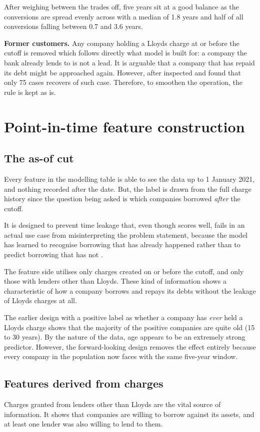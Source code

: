 \documentclass[ %
                    author={Natchalin Iwsakul \\[0.4em] Inkaphol Siriwongwattana \\[0.4em] Tanaphan Kummaraphat \\[0.6em] Patorn Srisupap},,
                supervisor={Fernando Moreno-Pino},
                    degree={MSc},
                     title={Propensity Modelling for SME Commercial Lending Using Open Public Data
},
                  subtitle={Companies House and GDELT as predictors of first-time borrowing},
                      type={},
                      year={2026}]{dissertation}
\begin{document}
After weighing between the trades off, five years sit at a good balance as the conversions are spread evenly across with a median of 1.8 years and half of all conversions falling between 0.7 and 3.6 years. 

\textbf{Former customers.} Any company holding a Lloyds charge at or before the cutoff is removed which follows directly what model is built for: a company the bank already lends to is not a lead. It is arguable that a company that has repaid its debt might be approached again. However, after inspected and found that only 75 cases recovers of such case. Therefore, to smoothen the operation, the rule is kept as is.

\section{Point-in-time feature construction}   \label{sec:features}
  \subsection{The as-of cut}
  Every feature in the modelling table is able to see the data up to 1 January 2021, and nothing recorded after the date. But, the label is drawn from the full charge history since the question being asked is which companies borrowed \textit{after} the cutoff.

  It is designed to prevent time leakage that, even though scores well, fails in an actual use case from misinterpreting the problem statement, because the model has learned to recognise borrowing that has already happened rather than to predict borrowing that has not \cite{kaufman2012leakage}. 

  The feature side utilises only charges created on or before the cutoff, and only those with lenders other than Lloyds. These kind of information shows a characteristic of how a company borrows and repays its debts without the leakage of Lloyds charges at all.

  The earlier design with a positive label as whether a company has \textit{ever} held a Lloyds charge shows that the majority of the positive companies are quite old (15 to 30 years). By the nature of the data, age appears to be an extremely strong predictor. However, the forward-looking design removes the effect entirely because every company in the population now faces with the same five-year window.

  \subsection{Features derived from charges}
  Charges granted from lenders other than Lloyds are the vital source of information. It shows that companies are willing to borrow against its assets, and at least one lender was also willing to lend to them.
\end{document}
